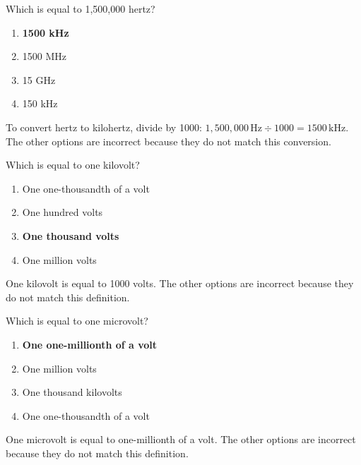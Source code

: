 \begin{tcolorbox}[colback=gray!10!white,colframe=black!75!black,title={T5B02}]
    Which is equal to 1,500,000 hertz?
    \begin{enumerate}[label=\Alph*),noitemsep]
        \item \textbf{1500 kHz}
        \item 1500 MHz
        \item 15 GHz
        \item 150 kHz
    \end{enumerate}
\end{tcolorbox}
To convert hertz to kilohertz, divide by 1000: \(1,500,000 \, \text{Hz} \div 1000 = 1500 \, \text{kHz}\). The other options are incorrect because they do not match this conversion.

\begin{tcolorbox}[colback=gray!10!white,colframe=black!75!black,title={T5B03}]
    Which is equal to one kilovolt?
    \begin{enumerate}[label=\Alph*),noitemsep]
        \item One one-thousandth of a volt
        \item One hundred volts
        \item \textbf{One thousand volts}
        \item One million volts
    \end{enumerate}
\end{tcolorbox}
One kilovolt is equal to 1000 volts. The other options are incorrect because they do not match this definition.

\begin{tcolorbox}[colback=gray!10!white,colframe=black!75!black,title={T5B04}]
    Which is equal to one microvolt?
    \begin{enumerate}[label=\Alph*),noitemsep]
        \item \textbf{One one-millionth of a volt}
        \item One million volts
        \item One thousand kilovolts
        \item One one-thousandth of a volt
    \end{enumerate}
\end{tcolorbox}
One microvolt is equal to one-millionth of a volt. The other options are incorrect because they do not match this definition.

